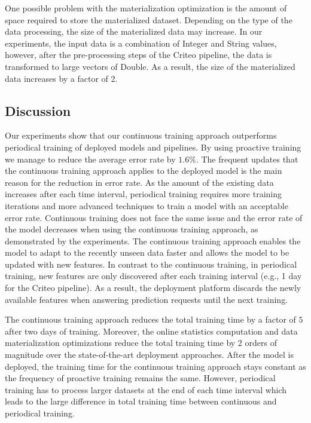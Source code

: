 One possible problem with the materialization optimization is the amount of space required to store the materialized dataset.
Depending on the type of the data processing, the size of the materialized data may increase.
In our experiments, the input data is a combination of Integer and String values, however, after the pre-processing steps of the Criteo pipeline, the data is transformed to large vectors of Double.
As a result, the size of the materialized data increases by a factor of 2.

\subsection{Discussion} \label{subsec:discussion}
Our experiments show that our continuous training approach outperforms periodical training of deployed models and pipelines.
By using proactive training we manage to reduce the average error rate by $1.6\%$.
The frequent updates that the continuous training approach applies to the deployed model is the main reason for the reduction in error rate.
As the amount of the existing data increases after each time interval, periodical training requires more training iterations and more advanced techniques to train a model with an acceptable error rate.
Continuous training does not face the same issue and the error rate of the model decreases when using the continuous training approach, as demonstrated by the experiments.
The continuous training approach enables the model to adapt to the recently unseen data faster and allows the model to be updated with new features.
In contrast to the continuous training, in periodical training, new features are only discovered after each training interval (e.g., 1 day for the Criteo pipeline).
As a result, the deployment platform discards the newly available features when answering prediction requests until the next training.

The continuous training approach reduces the total training time by a factor of $5$ after two days of training.
Moreover, the online statistics computation and data materialization optimizations reduce the total training time by 2 orders of magnitude over the state-of-the-art deployment approaches.
After the model is deployed, the training time for the continuous training approach stays constant as the frequency of proactive training remains the same.
However, periodical training has to process larger datasets at the end of each time interval which leads to the large difference in total training time between continuous and periodical training.

